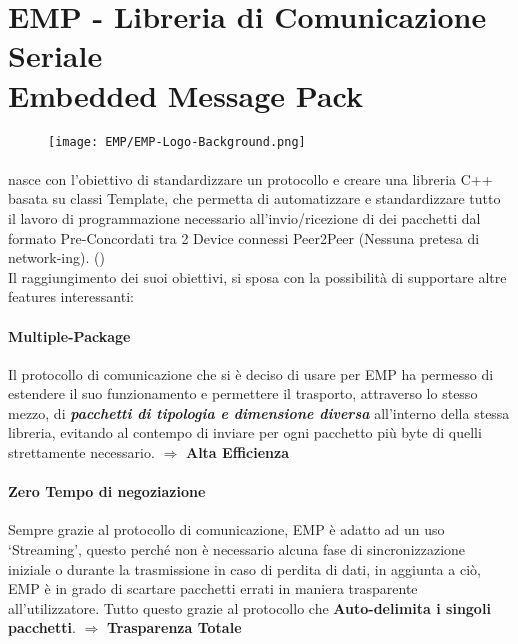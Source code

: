 \newpage

\section*{EMP - Libreria di Comunicazione Seriale\\Embedded Message Pack }\label{sec:EMP}

\begin{figure}[h]
	\centering
	\texttt{[image: EMP/EMP-Logo-Background.png]}
\end{figure}
\paragraph{} nasce con l’obiettivo di standardizzare un protocollo e creare una libreria C++ basata su classi Template, che permetta di automatizzare e standardizzare tutto il lavoro di programmazione necessario all’invio/ricezione di dei pacchetti dal formato Pre-Concordati tra 2 Device connessi Peer2Peer (Nessuna pretesa di network-ing). (\cite{EMP})\\
Il raggiungimento dei suoi obiettivi, si sposa con la possibilità di supportare altre features interessanti:

\paragraph{Multiple-Package} Il protocollo di comunicazione che si è deciso di usare per EMP ha permesso di estendere il suo funzionamento e permettere il trasporto, attraverso lo stesso mezzo, di \textit{\textbf{pacchetti di tipologia e dimensione diversa}} all’interno della stessa libreria, evitando al contempo di inviare per ogni pacchetto più byte di quelli strettamente necessario. $\Rightarrow$ \textbf{Alta Efficienza}

\paragraph{Zero Tempo di negoziazione} Sempre grazie al protocollo di comunicazione, EMP è adatto ad un uso ‘Streaming’, questo perché non è necessario alcuna fase di sincronizzazione iniziale o durante la trasmissione in caso di perdita di dati, in aggiunta a ciò, EMP è in grado di scartare pacchetti errati in maniera trasparente all’utilizzatore. Tutto questo grazie al protocollo che \textbf{Auto-delimita i singoli pacchetti}. $\Rightarrow$ \textbf{Trasparenza Totale}

